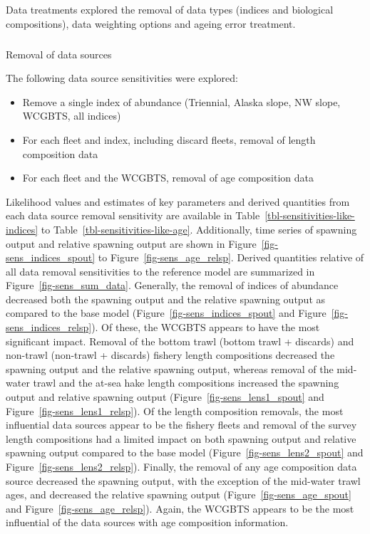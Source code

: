 \documentclass[
]{article}
\makeatletter
\let\oldsubparagraph\subparagraph
\renewcommand{\subparagraph}{
    \@ifstar
      \xxxSubParagraphStar
      \xxxSubParagraphNoStar
  }
\newcommand{\xxxSubParagraphStar}[1]{\oldsubparagraph*{#1}\mbox{}}
\newcommand{\xxxSubParagraphNoStar}[1]{\oldsubparagraph{#1}\mbox{}}
\providecommand{\tightlist}{%
  \setlength{\itemsep}{0pt}\setlength{\parskip}{0pt}}\usepackage{longtable,booktabs,array}
\makeatother
\begin{document}
Data treatments explored the removal of data types (indices and
biological compositions), data weighting options and ageing error
treatment.

\subparagraph{Removal of data sources}\label{removal-of-data-sources}

The following data source sensitivities were explored:

\begin{itemize}
\tightlist
\item
  Remove a single index of abundance (Triennial, Alaska slope, NW slope,
  WCGBTS, all indices)
\item
  For each fleet and index, including discard fleets, removal of length
  composition data
\item
  For each fleet and the WCGBTS, removal of age composition data
\end{itemize}

Likelihood values and estimates of key parameters and derived quantities
from each data source removal sensitivity are available in
Table~\ref{tbl-sensitivities-like-indices} to
Table~\ref{tbl-sensitivities-like-age}. Additionally, time series of
spawning output and relative spawning output are shown in
Figure~\ref{fig-sens_indices_spout} to Figure~\ref{fig-sens_age_relsp}.
Derived quantities relative of all data removal sensitivities to the
reference model are summarized in Figure~\ref{fig-sens_sum_data}.
Generally, the removal of indices of abundance decreased both the
spawning output and the relative spawning output as compared to the base
model (Figure~\ref{fig-sens_indices_spout} and
Figure~\ref{fig-sens_indices_relsp}). Of these, the WCGBTS appears to
have the most significant impact. Removal of the bottom trawl (bottom
trawl + discards) and non-trawl (non-trawl + discards) fishery length
compositions decreased the spawning output and the relative spawning
output, whereas removal of the mid-water trawl and the at-sea hake
length compositions increased the spawning output and relative spawning
output (Figure~\ref{fig-sens_lens1_spout} and
Figure~\ref{fig-sens_lens1_relsp}). Of the length composition removals,
the most influential data sources appear to be the fishery fleets and
removal of the survey length compositions had a limited impact on both
spawning output and relative spawning output compared to the base model
(Figure~\ref{fig-sens_lens2_spout} and
Figure~\ref{fig-sens_lens2_relsp}). Finally, the removal of any age
composition data source decreased the spawning output, with the
exception of the mid-water trawl ages, and decreased the relative
spawning output (Figure~\ref{fig-sens_age_spout} and
Figure~\ref{fig-sens_age_relsp}). Again, the WCGBTS appears to be the
most influential of the data sources with age composition information.
\end{document}
